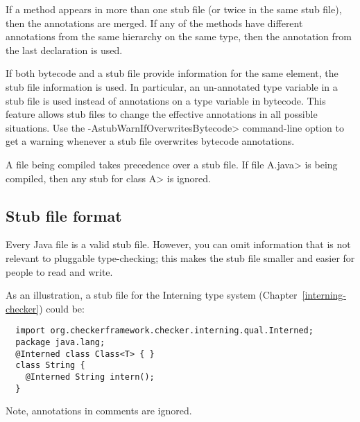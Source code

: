 If a method appears in more than one stub file (or twice in the same
stub file), then the annotations are merged. If any of the
methods have different annotations from the same hierarchy on the same type,
then the annotation from the last declaration is used.


If both bytecode and a stub file provide information for the same
element, the stub file information is used. In particular, an
un-annotated type variable in a stub file is used instead of
annotations on a type variable in bytecode.
This feature allows stub files to change the effective annotations in
all possible situations.
Use the \<-AstubWarnIfOverwritesBytecode> command-line option to get a
warning whenever a stub file overwrites bytecode annotations.

A file being compiled takes precedence over a stub file.  If file \<A.java>
is being compiled, then any stub for class \<A> is ignored.


\subsection{Stub file format\label{stub-format}}

Every Java file is a valid stub file.  However, you can omit information
that is not relevant to pluggable type-checking; this makes the stub file
smaller and easier for people to read and write.

As an illustration, a stub file for the Interning type system
(Chapter~\ref{interning-checker}) could be:

\begin{Verbatim}
  import org.checkerframework.checker.interning.qual.Interned;
  package java.lang;
  @Interned class Class<T> { }
  class String {
    @Interned String intern();
  }
\end{Verbatim}

Note, annotations in comments are ignored.


